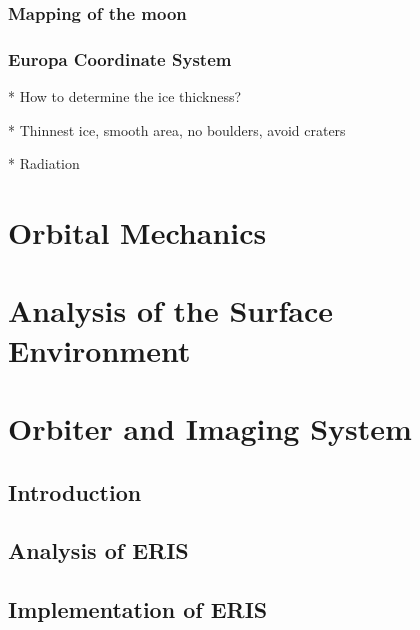 \subsection{Mapping of the moon}

\subsection{Europa Coordinate System}

* How to determine the ice thickness?

* Thinnest ice, smooth area, no boulders, avoid craters

* Radiation


\chapter{Orbital Mechanics}
\newpage
\listoftodos
\newpage


\chapter{Analysis of the Surface Environment}%

\chapter{Orbiter and Imaging System}
\section{Introduction}

\section{Analysis of ERIS}

\section{Implementation of ERIS}



